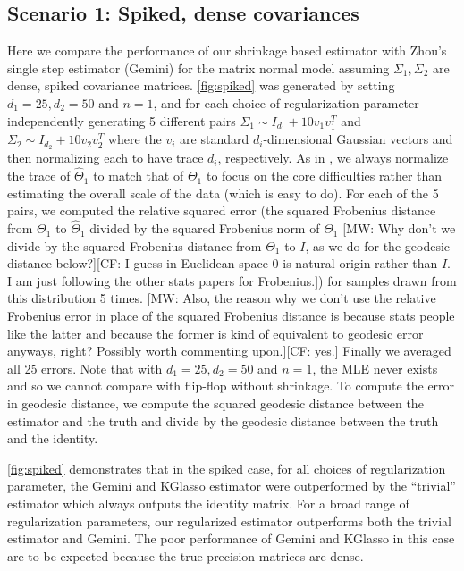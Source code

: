 \documentclass[aos]{imsart}
\theoremstyle{definition}
\numberwithin{equation}{section}
\newcommand{\htheta}{\widehat{\Theta}}
\newcommand{\CF}[1]{{\color{purple}[CF: #1]}}
\newcommand{\MW}[1]{{\color{red}[MW: #1]}}
\newcommand{\CF}[1]{{}}
\newcommand{\MW}[1]{{}}
\begin{document}
\subsection{Scenario 1: Spiked, dense covariances}
Here we compare the performance of our shrinkage based estimator with Zhou's single step estimator (Gemini) for the matrix normal model assuming $\Sigma_1, \Sigma_2$ are dense, spiked covariance matrices.
\cref{fig:spiked} was generated by setting $d_1 = 25, d_2 = 50$ and $n = 1$, and for each choice of regularization parameter independently generating 5 different pairs $\Sigma_1 \sim I_{d_1} + 10 v_1v_1^T$ and $\Sigma_2 \sim I_{d_2} + 10 v_2v_2^T$ where the $v_i$ are standard $d_i$-dimensional Gaussian vectors and then normalizing each to have trace $d_i$, respectively.
As in \cite{zhou2014gemini}, we always normalize the trace of $\htheta_1$ to match that of $\Theta_1$ to focus on the core difficulties rather than estimating the overall scale of the data (which is easy to do).
For each of the 5 pairs, we computed the relative squared error (the squared Frobenius distance from $\Theta_1$ to $\htheta_1$ divided by the squared Frobenius norm of $\Theta_1$ \MW{Why don't we divide by the squared Frobenius distance from $\Theta_1$ to $I$, as we do for the geodesic distance below?}\CF{I guess in Euclidean space 0 is natural origin rather than $I$. I am just following the other stats papers for Frobenius.}) for samples drawn from this distribution 5 times.
\MW{Also, the reason why we don't use the relative Frobenius error in place of the squared Frobenius distance is because stats people like the latter and because the former is kind of equivalent to geodesic error anyways, right? Possibly worth commenting upon.}\CF{yes.}
Finally we averaged all 25 errors.
Note that with $d_1 = 25, d_2 = 50$ and $n = 1$, the MLE never exists and so we cannot compare with flip-flop without shrinkage.
To compute the error in geodesic distance, we compute the squared geodesic distance between the estimator and the truth and divide by the geodesic distance between the truth and the identity.

\cref{fig:spiked} demonstrates that in the spiked case, for all choices of regularization parameter, the Gemini and KGlasso estimator were outperformed by the ``trivial'' estimator which always outputs the identity matrix.
For a broad range of regularization parameters, our regularized estimator outperforms both the trivial estimator and Gemini.
The poor performance of Gemini and KGlasso in this case are to be expected because the true precision matrices are dense.
\end{document}
